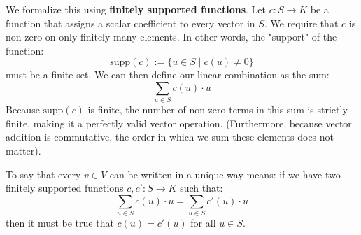 We formalize this using \textbf{finitely supported functions}. Let $c: S \to K$ be a function that assigns a scalar coefficient to every vector in $S$. We require that $c$ is non-zero on only finitely many elements. In other words, the "support" of the function:
\[
\text{supp}(c) := \{u \in S \mid c(u) \ne 0\}
\]
must be a finite set. We can then define our linear combination as the sum:
\[
\sum_{u \in S} c(u) \cdot u
\]
Because $\text{supp}(c)$ is finite, the number of non-zero terms in this sum is strictly finite, making it a perfectly valid vector operation. (Furthermore, because vector addition is commutative, the order in which we sum these elements does not matter).

\begin{center}
\end{center}

To say that every $v \in V$ can be written in a unique way means: if we have two finitely supported functions $c, c': S \to K$ such that:
\[
\sum_{u \in S} c(u) \cdot u = \sum_{u \in S} c'(u) \cdot u
\]
then it must be true that $c(u) = c'(u)$ for all $u \in S$. 

